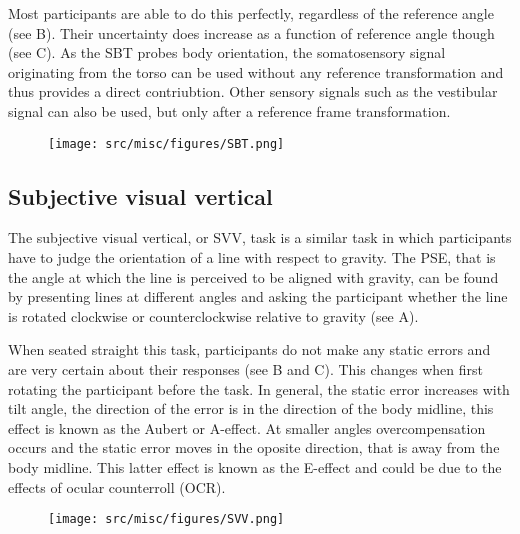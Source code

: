 Most participants are able to do this perfectly, regardless of the reference angle (see B). Their uncertainty does increase as a function of reference angle though (see C).
As the SBT probes body orientation, the somatosensory signal originating from the torso can be used without any reference transformation and thus provides a direct contriubtion. Other sensory signals such as the vestibular signal can also be used, but only after a reference frame transformation.

\begin{figure}
    \texttt{[image: src/misc/figures/SBT.png]}
    
    \caption{}
    \label{intro:fig4}
\end{figure}


\subsection{Subjective visual vertical}
The subjective visual vertical, or SVV, task is a similar task in which participants have to judge the orientation of a line with respect to gravity. The PSE, that is the angle at which the line is perceived to be aligned with gravity, can be found by presenting lines at different angles and asking the participant whether the line is rotated clockwise or counterclockwise relative to gravity (see A).

When seated straight this task, participants do not make any static errors and are very certain about their responses (see B and C). This changes when first rotating the participant before the task. In general, the static error increases with tilt angle, the direction of the error is in the direction of the body midline, this effect is known as the Aubert or A-effect. At smaller angles overcompensation occurs and the static error moves in the oposite direction, that is away from the body midline. This latter effect is known as the E-effect and could be due to the effects of ocular counterroll (OCR).

\begin{figure}
    \texttt{[image: src/misc/figures/SVV.png]}
    
    \caption{}
    \label{intro:fig5}
\end{figure}


